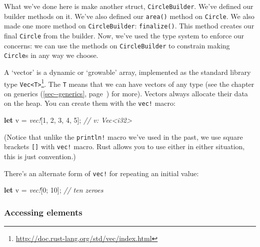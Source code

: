 \documentclass[a4paper,]{book}
\renewcommand*{\hyperref}[2][\ar]{%
  \def\ar{#2}%
  #2 (\autoref{#1}, page~\pageref{#1})}
\newenvironment{Shaded}{\begin{snugshade}}{\end{snugshade}}
\newcommand{\KeywordTok}[1]{\textcolor[rgb]{0.13,0.29,0.53}{\textbf{{#1}}}}
\newcommand{\DecValTok}[1]{\textcolor[rgb]{0.00,0.00,0.81}{{#1}}}
\newcommand{\CommentTok}[1]{\textcolor[rgb]{0.56,0.35,0.01}{\textit{{#1}}}}
\newcommand{\PreprocessorTok}[1]{\textcolor[rgb]{0.56,0.35,0.01}{\textit{{#1}}}}
\newcommand{\NormalTok}[1]{{#1}}
\renewcommand{\href}[2]{#2\footnote{\url{#1}}}
\begin{document}
What we've done here is make another struct, \texttt{CircleBuilder}.
We've defined our builder methods on it. We've also defined our
\texttt{area()} method on \texttt{Circle}. We also made one more method
on \texttt{CircleBuilder}: \texttt{finalize()}. This method creates our
final \texttt{Circle} from the builder. Now, we've used the type system
to enforce our concerns: we can use the methods on
\texttt{CircleBuilder} to constrain making \texttt{Circle}s in any way
we choose.


A `vector' is a dynamic or `growable' array, implemented as the standard
library type
\href{http://doc.rust-lang.org/std/vec/index.html}{\texttt{Vec\textless{}T\textgreater{}}}.
The \texttt{T} means that we can have vectors of any type (see the
chapter on \hyperref[sec--generics]{generics} for more). Vectors always
allocate their data on the heap. You can create them with the
\texttt{vec!} macro:

\begin{Shaded}
\begin{Highlighting}[]
\KeywordTok{let} \NormalTok{v = }\PreprocessorTok{vec!}\NormalTok{[}\DecValTok{1}\NormalTok{, }\DecValTok{2}\NormalTok{, }\DecValTok{3}\NormalTok{, }\DecValTok{4}\NormalTok{, }\DecValTok{5}\NormalTok{]; }\CommentTok{// v: Vec<i32>}
\end{Highlighting}
\end{Shaded}

(Notice that unlike the \texttt{println!} macro we've used in the past,
we use square brackets \texttt{{[}{]}} with \texttt{vec!} macro. Rust
allows you to use either in either situation, this is just convention.)

There's an alternate form of \texttt{vec!} for repeating an initial
value:

\begin{Shaded}
\begin{Highlighting}[]
\KeywordTok{let} \NormalTok{v = }\PreprocessorTok{vec!}\NormalTok{[}\DecValTok{0}\NormalTok{; }\DecValTok{10}\NormalTok{]; }\CommentTok{// ten zeroes}
\end{Highlighting}
\end{Shaded}

\subsubsection{Accessing elements}\label{accessing-elements}
\end{document}
